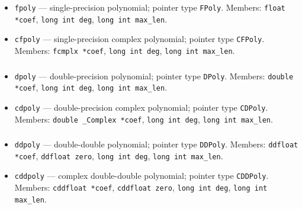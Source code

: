 \begin{itemize}
    \item \texttt{fpoly} --- single-precision polynomial; pointer type \texttt{FPoly}.
        Members: \texttt{float *coef}, \texttt{long int deg}, \texttt{long int max\_len}.
    \item \texttt{cfpoly} --- single-precision complex polynomial; pointer type \texttt{CFPoly}.
        Members: \texttt{fcmplx *coef}, \texttt{long int deg}, \texttt{long int max\_len}.
\end{itemize}

\subsubsection{}

\begin{itemize}
    \item \texttt{dpoly} --- double-precision polynomial; pointer type \texttt{DPoly}.
        Members: \texttt{double *coef}, \texttt{long int deg}, \texttt{long int max\_len}.
    \item \texttt{cdpoly} --- double-precision complex polynomial; pointer type \texttt{CDPoly}.
        Members: \texttt{double \_Complex *coef}, \texttt{long int deg}, \texttt{long int max\_len}.
\end{itemize}

\subsubsection{}

\begin{itemize}
    \item \texttt{ddpoly} --- double-double polynomial; pointer type \texttt{DDPoly}.
        Members: \texttt{ddfloat *coef}, \texttt{ddfloat zero}, \texttt{long int deg}, \texttt{long int max\_len}.
    \item \texttt{cddpoly} --- complex double-double polynomial; pointer type \texttt{CDDPoly}.
        Members: \texttt{cddfloat *coef}, \texttt{cddfloat zero}, \texttt{long int deg}, \texttt{long int max\_len}.
\end{itemize}

\subsubsection{}

